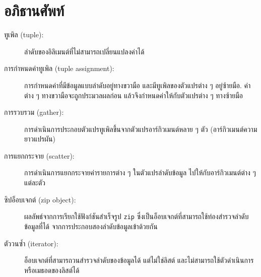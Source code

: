 \section{อภิธานศัพท์}

\begin{description}

\item[ทูเพิล (tuple):] 
ลำดับของอิลิเมนต์ที่ไม่สามารถเปลี่ยนแปลงค่าได้

\item[การกำหนดค่าทูเพิล (tuple assignment):] 
การกำหนดค่าที่มีข้อมูลแบบลำดับอยู่ทางขวามือ
และมีทูเพิลของตัวแปรต่าง ๆ อยู่ซ้ายมือ.
ค่าต่าง ๆ ทางขวามือจะถูกประมวลผลก่อน แล้วจึงกำหนดค่าให้กับตัวแปรต่าง ๆ ทางซ้ายมือ
%

\item[การรวบรวม (gather):] 
การดำเนินการประกอบตัวแปรทูเพิลขึ้นจากตัวแปรอาร์กิวเมนต์หลาย ๆ ตัว (อาร์กิวเมนต์ความยาวแปรผัน)

\item[การแยกกระจาย (scatter):] 
การดำเนินการแยกกระจายค่ารายการต่าง ๆ ในตัวแปรลำดับข้อมูล
ไปให้กับอาร์กิวเมนต์ต่าง ๆ แต่ละตัว

\item[ซิปอ็อบเจกต์ (zip object):] 
ผลลัพธ์จากการเรียกใช้ฟังก์ชันสำเร็จรูป \texttt{zip}
ซึ่งเป็นอ็อบเจกต์ที่สามารถใช้ท่องสำรวจลำดับข้อมูลที่ได้
จากการประกอบสองลำดับข้อมูลเข้าด้วยกัน

\item[ตัววนซ้ำ (iterator):] 
อ็อบเจกต์ที่สามารถวนสำรวจลำดับของข้อมูลได้
แต่ไม่ใช่ลิสต์ และไม่สามารถใช้ตัวดำเนินการหรือเมธอดของลิสต์ได้


\end{description}
